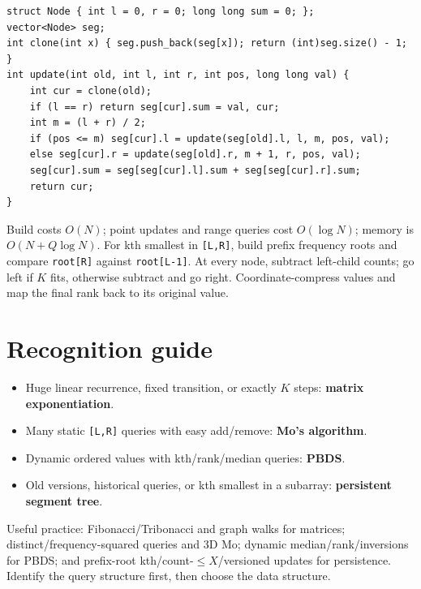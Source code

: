 \begin{lstlisting}
struct Node { int l = 0, r = 0; long long sum = 0; };
vector<Node> seg;
int clone(int x) { seg.push_back(seg[x]); return (int)seg.size() - 1; }
int update(int old, int l, int r, int pos, long long val) {
    int cur = clone(old);
    if (l == r) return seg[cur].sum = val, cur;
    int m = (l + r) / 2;
    if (pos <= m) seg[cur].l = update(seg[old].l, l, m, pos, val);
    else seg[cur].r = update(seg[old].r, m + 1, r, pos, val);
    seg[cur].sum = seg[seg[cur].l].sum + seg[seg[cur].r].sum;
    return cur;
}
\end{lstlisting}

Build costs $O(N)$; point updates and range queries cost $O(\log N)$; memory is $O(N + Q\log N)$. For kth smallest in \texttt{[L,R]}, build prefix frequency roots and compare \texttt{root[R]} against \texttt{root[L-1]}. At every node, subtract left-child counts; go left if $K$ fits, otherwise subtract and go right. Coordinate-compress values and map the final rank back to its original value.

\section{Recognition guide}
\begin{itemize}
\item Huge linear recurrence, fixed transition, or exactly $K$ steps: \textbf{matrix exponentiation}.
\item Many static \texttt{[L,R]} queries with easy add/remove: \textbf{Mo's algorithm}.
\item Dynamic ordered values with kth/rank/median queries: \textbf{PBDS}.
\item Old versions, historical queries, or kth smallest in a subarray: \textbf{persistent segment tree}.
\end{itemize}

Useful practice: Fibonacci/Tribonacci and graph walks for matrices; distinct/frequency-squared queries and 3D Mo; dynamic median/rank/inversions for PBDS; and prefix-root kth/count-$\leq X$/versioned updates for persistence. Identify the query structure first, then choose the data structure.
